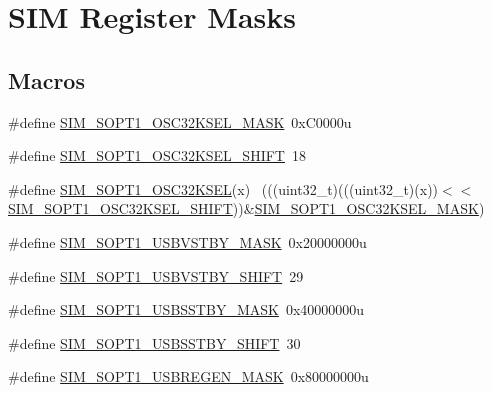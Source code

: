 \hypertarget{group___s_i_m___register___masks}{}\section{S\+IM Register Masks}
\label{group___s_i_m___register___masks}
\subsection*{Macros}
\begin{DoxyCompactItemize}
\item 
\#define \hyperlink{group___s_i_m___register___masks_ga5c660cd4a6d8062e6ef4afbc17c27fa4}{S\+I\+M\+\_\+\+S\+O\+P\+T1\+\_\+\+O\+S\+C32\+K\+S\+E\+L\+\_\+\+M\+A\+SK}~0x\+C0000u
\item 
\#define \hyperlink{group___s_i_m___register___masks_gac9e930c4ee375a2aee6fa6c97e061226}{S\+I\+M\+\_\+\+S\+O\+P\+T1\+\_\+\+O\+S\+C32\+K\+S\+E\+L\+\_\+\+S\+H\+I\+FT}~18
\item 
\#define \hyperlink{group___s_i_m___register___masks_ga7bede429b5cc2fda927f328ecd9ebd72}{S\+I\+M\+\_\+\+S\+O\+P\+T1\+\_\+\+O\+S\+C32\+K\+S\+EL}(x)                                  ~(((uint32\+\_\+t)(((uint32\+\_\+t)(x))$<$$<$\hyperlink{group___s_i_m___register___masks_gac9e930c4ee375a2aee6fa6c97e061226}{S\+I\+M\+\_\+\+S\+O\+P\+T1\+\_\+\+O\+S\+C32\+K\+S\+E\+L\+\_\+\+S\+H\+I\+FT}))\&\hyperlink{group___s_i_m___register___masks_ga5c660cd4a6d8062e6ef4afbc17c27fa4}{S\+I\+M\+\_\+\+S\+O\+P\+T1\+\_\+\+O\+S\+C32\+K\+S\+E\+L\+\_\+\+M\+A\+SK})
\item 
\#define \hyperlink{group___s_i_m___register___masks_gaaf0b406e4bd1800083f48727a7cde829}{S\+I\+M\+\_\+\+S\+O\+P\+T1\+\_\+\+U\+S\+B\+V\+S\+T\+B\+Y\+\_\+\+M\+A\+SK}~0x20000000u
\item 
\#define \hyperlink{group___s_i_m___register___masks_gae945165e21faf14e58288bce0918482a}{S\+I\+M\+\_\+\+S\+O\+P\+T1\+\_\+\+U\+S\+B\+V\+S\+T\+B\+Y\+\_\+\+S\+H\+I\+FT}~29
\item 
\#define \hyperlink{group___s_i_m___register___masks_ga93a808f7a1d75e26bc3ed565ab257617}{S\+I\+M\+\_\+\+S\+O\+P\+T1\+\_\+\+U\+S\+B\+S\+S\+T\+B\+Y\+\_\+\+M\+A\+SK}~0x40000000u
\item 
\#define \hyperlink{group___s_i_m___register___masks_ga8a24334d1be5bd01017bd364dd53f268}{S\+I\+M\+\_\+\+S\+O\+P\+T1\+\_\+\+U\+S\+B\+S\+S\+T\+B\+Y\+\_\+\+S\+H\+I\+FT}~30
\item 
\#define \hyperlink{group___s_i_m___register___masks_gac60c367119b3dcc752c4cf857b8a59b5}{S\+I\+M\+\_\+\+S\+O\+P\+T1\+\_\+\+U\+S\+B\+R\+E\+G\+E\+N\+\_\+\+M\+A\+SK}~0x80000000u
$$
\end{DoxyCompactItemize}
